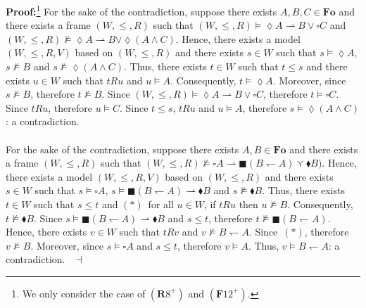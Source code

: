 \documentclass[draft]{article}
\newenvironment{proof}{{\bf Proof:}}{~$\dashv$\\}
\def\Formula{\mathbf{A}}
\def\Formula{\mathbf{F}}
\def\Rule{\mathbf{R}}
\def\Fo{\mathbf{Fo}}
\def\Log{\mathtt{Log}}
\begin{document}
\begin{proof}\footnote{We only consider the case of $(\Rule8^{+})$ and $(\Formula12^{+})$.}
%
%
%
%
%
%
%
For the sake of the contradiction, suppose there exists $A,B,C{\in}\Fo$ and there exists a frame $(W,{\leq},{R})$ such that $(W,{\leq},{R}){\models}{\lozenge}A{\rightharpoonup}B{\vee}{\square}C$ and $(W,{\leq},{R}){\not\models}{\lozenge}A{\rightharpoonup}B
%
%
%
%
%
%
%
$\linebreak$
%
%
%
%
%
%
{\vee}{\lozenge}(A{\wedge}C)$.
Hence, there exists a model $(W,{\leq},{R},V)$ based on $(W,{\leq},{R})$ and there exists $s{\in}W$ such that $s{\models}{\lozenge}A$, $s{\not\models}B$ and $s{\not\models}{\lozenge}(A{\wedge}C)$.
Thus, there exists $t{\in}W$ such that $t{\leq}s$ and there exists $u{\in}W$ such that $t{R}u$ and $u{\models}A$.
Consequently, $t{\models}{\lozenge}A$.
Moreover, since $s{\not\models}B$, therefore $t{\not\models}B$.
Since $(W,{\leq},{R}){\models}{\lozenge}A{\rightharpoonup}B{\vee}{\square}C$, therefore $t{\models}{\square}C$.
Since $t{R}u$, therefore $u{\models}C$.
Since $t{\leq}s$, $t{R}u$ and $u{\models}A$, therefore $s{\models}{\lozenge}(A{\wedge}C)$: a contradiction.
%
%
\\
\\
%
%
For the sake of the contradiction, suppose there exists $A,B{\in}\Fo$ and there exists a frame $(W,{\leq},{R})$ such that $(W,{\leq},{R}){\not\models}{\square}A{\rightharpoonup}{\blacksquare}(B{\leftharpoondown}A){\curlyvee}{\blacklozenge}B)$.
Hence, there exists a model $(W,{\leq},{R},V)$ based on $(W,{\leq},{R})$ and there exists $s{\in}W$ such that $s{\models}{\square}A$, $s{\models}{\blacksquare}(B{\leftharpoondown}A){\rightharpoonup}{\blacklozenge}B$ and $s{\not\models}{\blacklozenge}B$.
Thus, there exists $t{\in}W$ such that $s{\leq}t$ and $\mathbf{(\ast)}$~for all $u{\in}W$, if $t{R}u$ then $u{\not\models}B$.
Consequently, $t{\not\models}{\blacklozenge}B$.
Since $s{\models}{\blacksquare}(B{\leftharpoondown}A){\rightharpoonup}{\blacklozenge}B$ and $s{\leq}t$, therefore $t{\not\models}{\blacksquare}(B{\leftharpoondown}A)$.
Hence, there exists $v{\in}W$ such that $t{R}v$ and $v{\not\models}B{\leftharpoondown}A$.
Since~$\mathbf{(\ast)}$, therefore $v{\not\models}B$.
Moreover, since $s{\models}{\square}A$ and $s{\leq}t$, therefore $v{\models}A$.
Thus, $v{\models}B{\leftharpoondown}A$: a contradiction.
%
%
\medskip
%
%
\end{proof}
\end{document}
